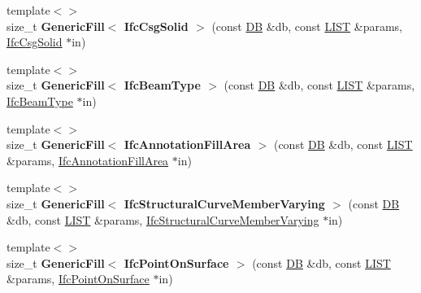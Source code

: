 \begin{DoxyCompactItemize}
\item 
\hypertarget{namespace_assimp_1_1_s_t_e_p_a906ef8ae6e018cb1eaba03300b115443}{{\footnotesize template$<$$>$ }\\size\+\_\+t {\bfseries Generic\+Fill$<$ Ifc\+Csg\+Solid $>$} (const \hyperlink{class_assimp_1_1_s_t_e_p_1_1_d_b}{D\+B} \&db, const \hyperlink{class_assimp_1_1_s_t_e_p_1_1_e_x_p_r_e_s_s_1_1_l_i_s_t}{L\+I\+S\+T} \&params, \hyperlink{struct_assimp_1_1_i_f_c_1_1_ifc_csg_solid}{Ifc\+Csg\+Solid} $\ast$in)}\label{namespace_assimp_1_1_s_t_e_p_a906ef8ae6e018cb1eaba03300b115443}

\item 
\hypertarget{namespace_assimp_1_1_s_t_e_p_a6a9db39d8d2b200e14b926c7eabe83d8}{{\footnotesize template$<$$>$ }\\size\+\_\+t {\bfseries Generic\+Fill$<$ Ifc\+Beam\+Type $>$} (const \hyperlink{class_assimp_1_1_s_t_e_p_1_1_d_b}{D\+B} \&db, const \hyperlink{class_assimp_1_1_s_t_e_p_1_1_e_x_p_r_e_s_s_1_1_l_i_s_t}{L\+I\+S\+T} \&params, \hyperlink{struct_assimp_1_1_i_f_c_1_1_ifc_beam_type}{Ifc\+Beam\+Type} $\ast$in)}\label{namespace_assimp_1_1_s_t_e_p_a6a9db39d8d2b200e14b926c7eabe83d8}

\item 
\hypertarget{namespace_assimp_1_1_s_t_e_p_a40e2ba155f8bca4fa7f01704f9e70f3c}{{\footnotesize template$<$$>$ }\\size\+\_\+t {\bfseries Generic\+Fill$<$ Ifc\+Annotation\+Fill\+Area $>$} (const \hyperlink{class_assimp_1_1_s_t_e_p_1_1_d_b}{D\+B} \&db, const \hyperlink{class_assimp_1_1_s_t_e_p_1_1_e_x_p_r_e_s_s_1_1_l_i_s_t}{L\+I\+S\+T} \&params, \hyperlink{struct_assimp_1_1_i_f_c_1_1_ifc_annotation_fill_area}{Ifc\+Annotation\+Fill\+Area} $\ast$in)}\label{namespace_assimp_1_1_s_t_e_p_a40e2ba155f8bca4fa7f01704f9e70f3c}

\item 
\hypertarget{namespace_assimp_1_1_s_t_e_p_af9b98abfef9ed6d93fc0861997f0d5b6}{{\footnotesize template$<$$>$ }\\size\+\_\+t {\bfseries Generic\+Fill$<$ Ifc\+Structural\+Curve\+Member\+Varying $>$} (const \hyperlink{class_assimp_1_1_s_t_e_p_1_1_d_b}{D\+B} \&db, const \hyperlink{class_assimp_1_1_s_t_e_p_1_1_e_x_p_r_e_s_s_1_1_l_i_s_t}{L\+I\+S\+T} \&params, \hyperlink{struct_assimp_1_1_i_f_c_1_1_ifc_structural_curve_member_varying}{Ifc\+Structural\+Curve\+Member\+Varying} $\ast$in)}\label{namespace_assimp_1_1_s_t_e_p_af9b98abfef9ed6d93fc0861997f0d5b6}

\item 
\hypertarget{namespace_assimp_1_1_s_t_e_p_a46507890e569c36a74dc9a7bb413c8b8}{{\footnotesize template$<$$>$ }\\size\+\_\+t {\bfseries Generic\+Fill$<$ Ifc\+Point\+On\+Surface $>$} (const \hyperlink{class_assimp_1_1_s_t_e_p_1_1_d_b}{D\+B} \&db, const \hyperlink{class_assimp_1_1_s_t_e_p_1_1_e_x_p_r_e_s_s_1_1_l_i_s_t}{L\+I\+S\+T} \&params, \hyperlink{struct_assimp_1_1_i_f_c_1_1_ifc_point_on_surface}{Ifc\+Point\+On\+Surface} $\ast$in)}\label{namespace_assimp_1_1_s_t_e_p_a46507890e569c36a74dc9a7bb413c8b8}


\end{DoxyCompactItemize}
